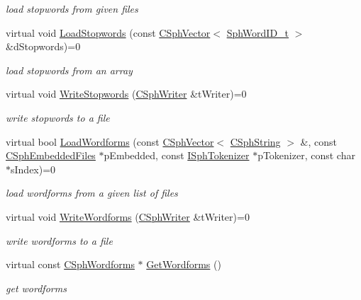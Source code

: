 \begin{DoxyCompactItemize}
\begin{DoxyCompactList}\small\item\em load stopwords from given files \end{DoxyCompactList}\item 
virtual void \hyperlink{classCSphDict_a0aecfbeb767d0e8eec971603aa5e0136}{Load\-Stopwords} (const \hyperlink{classCSphVector}{C\-Sph\-Vector}$<$ \hyperlink{sphinx_8h_a80a94d5984fdf9214a98f3e5e65df963}{Sph\-Word\-I\-D\-\_\-t} $>$ \&d\-Stopwords)=0
\begin{DoxyCompactList}\small\item\em load stopwords from an array \end{DoxyCompactList}\item 
virtual void \hyperlink{classCSphDict_a91dc4477648a1e6f3b1f8cb791822732}{Write\-Stopwords} (\hyperlink{classCSphWriter}{C\-Sph\-Writer} \&t\-Writer)=0
\begin{DoxyCompactList}\small\item\em write stopwords to a file \end{DoxyCompactList}\item 
virtual bool \hyperlink{classCSphDict_a3e744fe20a3e62efe16d594658b8006a}{Load\-Wordforms} (const \hyperlink{classCSphVector}{C\-Sph\-Vector}$<$ \hyperlink{structCSphString}{C\-Sph\-String} $>$ \&, const \hyperlink{structCSphEmbeddedFiles}{C\-Sph\-Embedded\-Files} $\ast$p\-Embedded, const \hyperlink{classISphTokenizer}{I\-Sph\-Tokenizer} $\ast$p\-Tokenizer, const char $\ast$s\-Index)=0
\begin{DoxyCompactList}\small\item\em load wordforms from a given list of files \end{DoxyCompactList}\item 
virtual void \hyperlink{classCSphDict_af490ff06f000637b7cb3ce5660ac1cba}{Write\-Wordforms} (\hyperlink{classCSphWriter}{C\-Sph\-Writer} \&t\-Writer)=0
\begin{DoxyCompactList}\small\item\em write wordforms to a file \end{DoxyCompactList}\item 
virtual const \hyperlink{structCSphWordforms}{C\-Sph\-Wordforms} $\ast$ \hyperlink{classCSphDict_a5a403d37f97adec3fab06dc988b8be0d}{Get\-Wordforms} ()
\begin{DoxyCompactList}\small\item\em get wordforms \end{DoxyCompactList}\item 

\end{DoxyCompactItemize}
